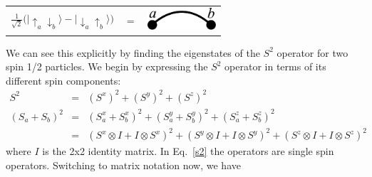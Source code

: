 \begin{center}
\begin{tabular}{ccc}
$  \frac{1}{\sqrt{2}}\big( \lvert \uparrow_a \downarrow_b \rangle - \lvert \downarrow_a \uparrow_b \rangle \big) $ & $= $
&
\includegraphics [width=1in]
{./figures/made/bond2.pdf}
\end{tabular}
\end{center}

We can see this explicitly by finding the eigenstates of the $S^2$ operator for 
two spin 1/2 particles.  We begin by expressing the $S^2$ operator in terms of its different
spin components:
\begin{eqnarray}
S^2 &=& (S^x)^2 + (S^y)^2 + (S^z)^2 \\
(S_a + S_b)^2 &=& (S^x_a+S^x_b)^2 + (S^y_a+S^y_b)^2 + (S^z_a+S^z_b)^2 \nonumber \\
			&=&(S^x\otimes I+I \otimes S^x)^2 + 
			(S^y\otimes I+I\otimes S^y)^2 + (S^z\otimes I+I\otimes S^z)^2
			\label{s2}
\end{eqnarray}
where $I$ is the 2x2 identity matrix.  In Eq.~\eqref{s2} the operators are single spin operators.
Switching to matrix notation now, we have
